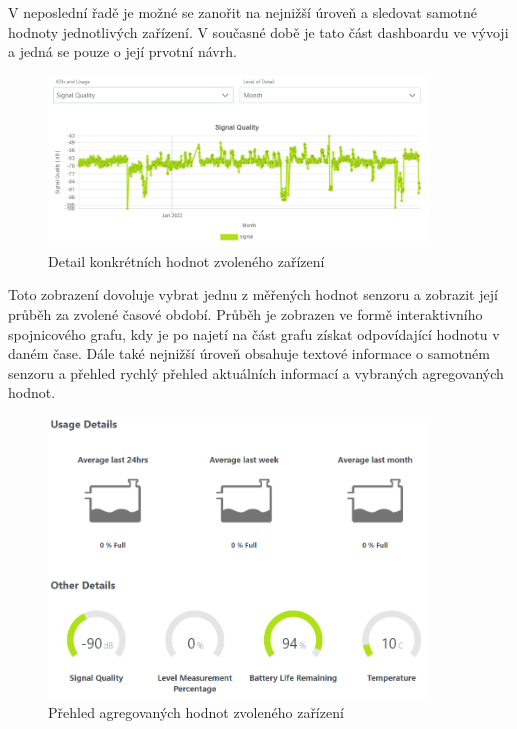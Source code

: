 V neposlední řadě je možné se zanořit na nejnižší úroveň a sledovat samotné hodnoty jednotlivých zařízení. V současné době je tato část dashboardu ve vývoji a jedná se pouze o její prvotní návrh. 

\begin{figure}[H]
\label{question4}
\begin{center}
    \includegraphics[width=0.9\textwidth]{obrazky-figures/l4_stats.png}
\end{center}
\caption{Detail konkrétních hodnot zvoleného zařízení}
\end{figure}

Toto zobrazení dovoluje vybrat jednu z měřených hodnot senzoru a zobrazit její průběh za zvolené časové období. Průběh je zobrazen ve formě interaktivního spojnicového grafu, kdy je po najetí na část grafu získat odpovídající hodnotu v daném čase. Dále také nejnižší úroveň obsahuje textové informace o samotném senzoru a přehled rychlý přehled aktuálních informací a vybraných agregovaných hodnot.

\begin{figure}[H]
\label{question4}
\begin{center}
    \includegraphics[width=0.9\textwidth]{obrazky-figures/l4_extras.png}
\end{center}
\caption{Přehled agregovaných hodnot zvoleného zařízení}
\end{figure}


